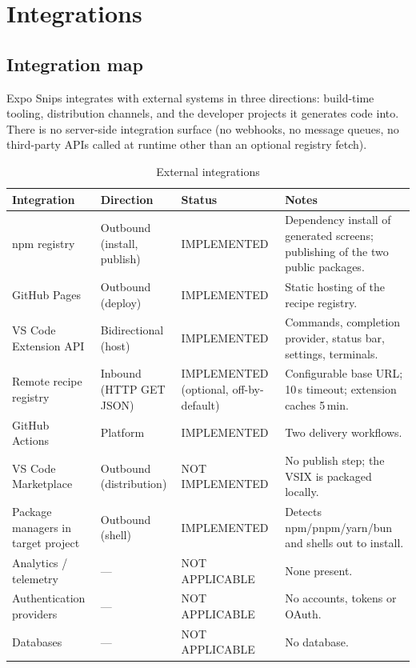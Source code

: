 \chapter{Integrations}
\label{ch:integrations}

\section{Integration map}

Expo Snips integrates with external systems in three directions: build-time
tooling, distribution channels, and the developer projects it generates code
into. There is no server-side integration surface (no webhooks, no message
queues, no third-party APIs called at runtime other than an optional registry
fetch).

\begin{longtable}{p{3.1cm}p{2.2cm}p{3.2cm}p{5.6cm}}
\caption{External integrations}\\
\toprule
\textbf{Integration} & \textbf{Direction} & \textbf{Status} & \textbf{Notes} \\
\midrule

npm registry & Outbound (install, publish) & IMPLEMENTED & Dependency install of
generated screens; publishing of the two public packages. \\
GitHub Pages & Outbound (deploy) & IMPLEMENTED & Static hosting of the recipe
registry. \\
VS Code Extension API & Bidirectional (host) & IMPLEMENTED & Commands, completion
provider, status bar, settings, terminals. \\
Remote recipe registry & Inbound (HTTP GET JSON) & IMPLEMENTED (optional,
off-by-default) & Configurable base URL; 10\,s timeout; extension caches 5\,min. \\
GitHub Actions & Platform & IMPLEMENTED & Two delivery workflows. \\
VS Code Marketplace & Outbound (distribution) & NOT IMPLEMENTED & No publish step;
the VSIX is packaged locally. \\
Package managers in target project & Outbound (shell) & IMPLEMENTED & Detects
npm/pnpm/yarn/bun and shells out to install. \\
Analytics / telemetry & --- & NOT APPLICABLE & None present. \\
Authentication providers & --- & NOT APPLICABLE & No accounts, tokens or OAuth. \\
Databases & --- & NOT APPLICABLE & No database. \\
\bottomrule
\end{longtable}

